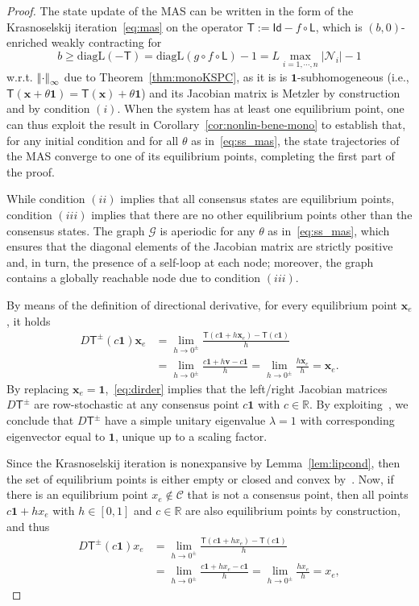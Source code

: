\documentclass[journal,twoside,web]{ieeecolor}
\newcommand{\abs}[1]{{\left\vert #1 \right\vert}}
\newcommand{\norminf}[1]{{\left\vert\kern-0.25ex\left\vert #1\right\vert\kern-0.25ex\right\vert}_{\infty}}
\newcommand{\rea }{\mathbb{R}}
\newcommand{\xb}{\boldsymbol{x}}
\newcommand{\vb}{\boldsymbol{v}}
\newcommand{\Ls}{\mathsf{L}}
\newcommand{\Ts}{\mathsf{T}}
\newcommand{\Is}{\mathsf{Id}}
\newcommand{\Gc}{\mathcal{G}}
\newcommand{\Nc}{\mathcal{N}}
\newcommand{\bone}{\boldsymbol{1}}
\begin{document}
\begin{proof}%
The state update of the MAS can be written in the form of the Krasnoselskij iteration~\eqref{eq:mas} on the operator ${\Ts:=\Is-f\circ\Ls}$, which is $(b,0)$-enriched weakly contracting for
%
$$
b\geq \text{diagL}(-\Ts)=\text{diagL}(g\circ f\circ\Ls)-1 = L\max_{i=1,\cdots,n}\abs{\Nc_i} -1
$$
%
w.r.t. $\norminf{\cdot}$ due to Theorem~\ref{thm:monoKSPC}, as it is is $\bone$-subhomogeneous (i.e., ${\Ts(\xb+\theta\bone) = \Ts(\xb) + \theta\bone}$) and its Jacobian matrix is Metzler by construction and by condition $(i)$.
%
When the system has at least one equilibrium point, one can thus exploit the result in Corollary~\ref{cor:nonlin-bene-mono} to establish that, for any initial condition and for all $\theta$ as in~\eqref{eq:ss_mas}, the state trajectories of the MAS converge to one of its equilibrium points, completing the first part of the proof.

While condition $(ii)$ implies that all consensus states are equilibrium points, condition $(iii)$ implies that there are no other equilibrium points other than the consensus states.
%
The graph $\Gc$ is aperiodic for any $\theta$ as in~\eqref{eq:ss_mas}, which ensures that the diagonal elements of the Jacobian matrix are strictly positive and, in turn, the presence of a self-loop at each node; moreover, the graph contains a globally reachable node due to condition $(iii)$.

By means of the definition of directional derivative, for every equilibrium point $\xb_e$, it holds
%
\begin{equation}\label{eq:dirder}
\begin{aligned}
D\Ts^{\pm}(c\bone)\xb_e &=
%
\lim_{h\rightarrow 0^{\pm}} \frac{\Ts(c\bone+h \xb_e)-\Ts(c\bone)}{h}\\
%
&=\lim_{h\rightarrow 0^{\pm}} \frac{c\bone+h\vb-c\bone}{h}
=\lim_{h\rightarrow 0^{\pm}} \frac{h\xb_e}{h}=\xb_e.
\end{aligned}
\end{equation}
%
By replacing $\xb_e=\bone$,~\eqref{eq:dirder} implies that the left/right Jacobian matrices $D\Ts^\pm$ are row-stochastic at any consensus point $c\bone$ with $c\in\rea$. By exploiting~\cite[Theorem 5.1]{Bullo18}, we conclude that $D\Ts^{\pm}$ have a simple unitary eigenvalue $\lambda = 1$ with corresponding eigenvector equal to $\bone$, unique up to a scaling factor.

Since the Krasnoselskij iteration is nonexpansive by Lemma~\ref{lem:lipcond}, then the set of equilibrium points is either empty or closed and convex by~\cite[Theorem 1]{Ferreira96}.
%
Now, if there is an equilibrium point $x_e\not\in\mathcal{C}$ that is not a consensus point, then all points ${c\bone + h x_e}$ with $h\in[0,1]$ and $c\in\mathbb{R}$ are also equilibrium points by construction, and thus
%
\begin{align*}
D\Ts^{\pm}(c\bone)x_e &=
%
\lim_{h\rightarrow 0^{\pm}} \frac{\Ts(c\bone+h x_e)-\Ts(c\bone)}{h}\\
%
&=\lim_{h\rightarrow 0^{\pm}} \frac{c\bone+hx_e-c\bone}{h}
=\lim_{h\rightarrow 0^{\pm}} \frac{hx_e}{h}=x_e,
\end{align*}


\end{proof}
\end{document}
